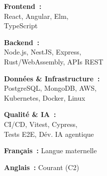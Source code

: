 \documentclass[letterpaper,11pt]{article}
\begin{document}
\begin{cv}[profile][2]
    \begin{cvitem}
        \textbf{Frontend~:} \\
        React, Angular, Elm, \\
        TypeScript
    \end{cvitem}

    \cvseparator[1]
    \begin{cvitem}
        \textbf{Backend~:} \\
        Node.js, NestJS, Express, \\
        Rust/WebAssembly, APIs REST
    \end{cvitem}

    \cvseparator[1]
    \begin{cvitem}
        \textbf{Donn\'ees \& Infrastructure~:} \\
        PostgreSQL, MongoDB, AWS, \\
        Kubernetes, Docker, Linux
    \end{cvitem}

    \cvseparator[1]
    \begin{cvitem}
        \textbf{Qualit\'e \& IA~:} \\
        CI/CD, Vitest, Cypress, \\
        Tests E2E, D\'ev. IA agentique
    \end{cvitem}

\begin{cvitem}
    \textbf{Fran\c{c}ais~:} Langue maternelle
\end{cvitem}

\cvseparator
\begin{cvitem}
    \textbf{Anglais~:} Courant (C2)
\end{cvitem}


\end{cv}
\end{document}
